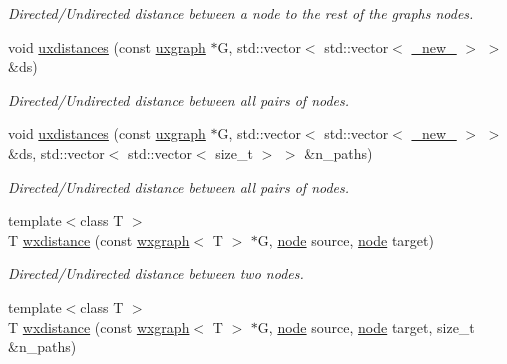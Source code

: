 \begin{DoxyCompactItemize}
\begin{DoxyCompactList}\small\item\em Directed/\+Undirected distance between a node to the rest of the graph\textquotesingle{}s nodes. \end{DoxyCompactList}\item 
void \hyperlink{namespacelgraph_1_1traversal_a401cf82c5e153e82a73f4be9d5d75288}{uxdistances} (const \hyperlink{classlgraph_1_1uxgraph}{uxgraph} $\ast$G, std\+::vector$<$ std\+::vector$<$ \hyperlink{namespacelgraph_aa930092705699c3af78e3a4de7880a3f}{\+\_\+new\+\_\+} $>$ $>$ \&ds)
\begin{DoxyCompactList}\small\item\em Directed/\+Undirected distance between all pairs of nodes. \end{DoxyCompactList}\item 
void \hyperlink{namespacelgraph_1_1traversal_ad372437fe4156af974637e9908a0f284}{uxdistances} (const \hyperlink{classlgraph_1_1uxgraph}{uxgraph} $\ast$G, std\+::vector$<$ std\+::vector$<$ \hyperlink{namespacelgraph_aa930092705699c3af78e3a4de7880a3f}{\+\_\+new\+\_\+} $>$ $>$ \&ds, std\+::vector$<$ std\+::vector$<$ size\+\_\+t $>$ $>$ \&n\+\_\+paths)
\begin{DoxyCompactList}\small\item\em Directed/\+Undirected distance between all pairs of nodes. \end{DoxyCompactList}\item 
{\footnotesize template$<$class T $>$ }\\T \hyperlink{namespacelgraph_1_1traversal_a6f7355bc246be223e074d737810f2fb4}{wxdistance} (const \hyperlink{classlgraph_1_1wxgraph}{wxgraph}$<$ T $>$ $\ast$G, \hyperlink{namespacelgraph_a397169dd66adf725210a30fb7251773e}{node} source, \hyperlink{namespacelgraph_a397169dd66adf725210a30fb7251773e}{node} target)
\begin{DoxyCompactList}\small\item\em Directed/\+Undirected distance between two nodes. \end{DoxyCompactList}\item 
{\footnotesize template$<$class T $>$ }\\T \hyperlink{namespacelgraph_1_1traversal_a39a6c5e2fa275d28c02051dbbd934e39}{wxdistance} (const \hyperlink{classlgraph_1_1wxgraph}{wxgraph}$<$ T $>$ $\ast$G, \hyperlink{namespacelgraph_a397169dd66adf725210a30fb7251773e}{node} source, \hyperlink{namespacelgraph_a397169dd66adf725210a30fb7251773e}{node} target, size\+\_\+t \&n\+\_\+paths)

\end{DoxyCompactItemize}

